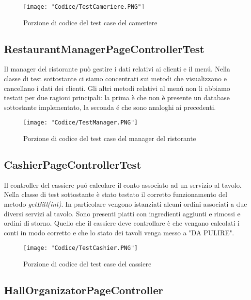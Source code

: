 \documentclass{article}
\begin{document}
\begin{figure}[!h]
\centering
\texttt{[image: "Codice/TestCameriere.PNG"]}
\caption{Porzione di codice del test case del cameriere}
\end{figure}

\newpage

\subsection{RestaurantManagerPageControllerTest}

Il manager del ristorante può gestire i dati relativi ai clienti e il men\'u. Nella classe di test sottostante ci siamo concentrati sui metodi che visualizzano e cancellano i dati dei clienti. Gli altri metodi relativi al men\'u non li abbiamo testati per due ragioni principali: la prima è che non è presente un database sottostante implementato, la seconda \'e che sono analoghi ai precedenti.

\begin{figure}[!h]
\centering
\texttt{[image: "Codice/TestManager.PNG"]}
\caption{Porzione di codice del test case del manager del ristorante}
\end{figure}

\subsection{CashierPageControllerTest}

Il controller del cassiere pu\'o calcolare il conto associato ad un servizio al tavolo. Nella classe di test sottostante è stato testato il corretto funzionamento del metodo \textit{getBill(int)}. In particolare vengono istanziati alcuni ordini associati a due diversi servizi al tavolo. Sono presenti piatti con ingredienti aggiunti e rimossi e ordini di storno. Quello che il cassiere deve controllare è che vengano calcolati i conti in modo corretto e che lo stato dei tavoli venga messo a "DA PULIRE".

\begin{figure}[!h]
\centering
\texttt{[image: "Codice/TestCashier.PNG"]}
\caption{Porzione di codice del test case del cassiere}
\end{figure}

\newpage

\subsection{HallOrganizatorPageController}
\end{document}
